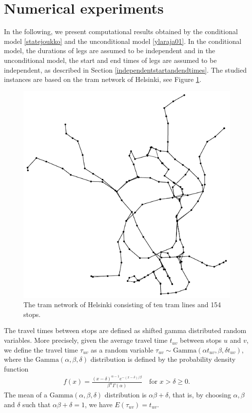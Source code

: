 \documentclass[dissertation,draft*]{aaltoseries}
\begin{document}
\section{Numerical experiments}
\label{experiments}
In the following, we present computational results obtained by the 
conditional model \eqref{statejoukko} and the unconditional model \eqref{ylaraja01}.
In the conditional model, the durations of legs are assumed to be independent 
and in the unconditional model, the start and end times of legs are assumed to
be independent, as described in Section \ref{independentstartandendtimes}.
The studied instances are based on the tram network of Helsinki, see Figure \ref{verkot01}.

\begin{figure}[ht]
\begin{center}
\includegraphics[width=0.7\columnwidth]{verkot01a}
\end{center}
\caption{The tram network of Helsinki consisting of ten tram lines and 154 stops. 
}
\label{verkot01}
\end{figure}

The travel times between stops are defined as shifted gamma distributed random variables. 
More precisely, given the average travel time $t_{uv}$ between stops $u$ and $v$, we define the 
travel time $\tau_{uv}$ as a random variable $\tau_{uv} \sim \text{Gamma}( \alpha t_{uv}, \beta , \delta t_{uv} )$,
where the $\text{Gamma}( \alpha, \beta , \delta )$ distribution is defined by the 
probability density function 
\begin{align}
\label{gammakaava}
f(x)=\frac{(x-\delta)^{\alpha-1} e^{-(x-\delta)/\beta}}{\beta^{\alpha} \Gamma (\alpha)} \ \ \ \mbox{ for } x > \delta \geq 0.
\end{align}
The mean of a $\text{Gamma} (\alpha, \beta, \delta)$ distribution is $\alpha \beta + \delta$,
that is, by choosing $\alpha, \beta$ and $\delta$ such that $\alpha \beta + \delta= 1$,
we have $E(\tau_{uv})=t_{uv}$. 
\end{document}
